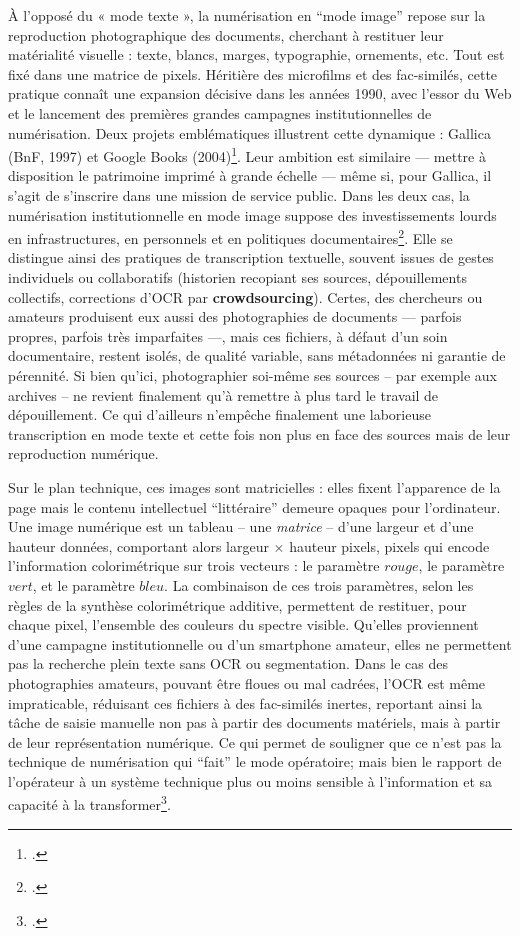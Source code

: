 À l’opposé du « mode texte », la numérisation en \enquote{mode image} repose sur la reproduction photographique des documents, cherchant à restituer leur matérialité visuelle : texte, blancs, marges, typographie, ornements, etc. Tout est fixé dans une matrice de pixels. Héritière des microfilms et des fac-similés, cette pratique connaît une expansion décisive dans les années 1990, avec l’essor du Web et le lancement des premières grandes campagnes institutionnelles de numérisation. Deux projets emblématiques illustrent cette dynamique : Gallica (BnF, 1997) et Google Books (2004)\footcite[][]{bermesbook}. Leur ambition est similaire — mettre à disposition le patrimoine imprimé à grande échelle — même si, pour Gallica, il s'agit de s’inscrire dans une mission de service public. Dans les deux cas, la numérisation institutionnelle en mode image suppose des investissements lourds en infrastructures, en personnels et en politiques documentaires\footcite[][p. 66-88]{claerr}. Elle se distingue ainsi des pratiques de transcription textuelle, souvent issues de gestes individuels ou collaboratifs (historien recopiant ses sources, dépouillements collectifs, corrections d’OCR par \textbf{crowdsourcing}). Certes, des chercheurs ou amateurs produisent eux aussi des photographies de documents — parfois propres, parfois très imparfaites —, mais ces fichiers, à défaut d'un soin documentaire, restent isolés, de qualité variable, sans métadonnées ni garantie de pérennité. Si bien qu'ici, photographier soi-même ses sources -- par exemple aux archives -- ne revient finalement qu'à remettre à plus tard le travail de dépouillement. Ce qui d'ailleurs n'empêche finalement une laborieuse transcription en mode texte et cette fois non plus en face des sources mais de leur reproduction numérique. 

Sur le plan technique, ces images sont matricielles : elles fixent l’apparence de la page mais le contenu intellectuel \enquote{littéraire} demeure opaques pour l’ordinateur. Une image numérique est un tableau -- une \emph{matrice} -- d'une largeur et d'une hauteur données, comportant alors largeur $\times$ hauteur pixels, pixels qui encode l'information colorimétrique sur trois vecteurs : le paramètre $rouge$, le paramètre $vert$, et le paramètre $bleu$. La combinaison de ces trois paramètres, selon les règles de la synthèse colorimétrique additive, permettent de restituer, pour chaque pixel, l'ensemble des couleurs du spectre visible. Qu’elles proviennent d’une campagne institutionnelle ou d’un smartphone amateur, elles ne permettent pas la recherche plein texte sans OCR ou segmentation. Dans le cas des photographies amateurs, pouvant être floues ou mal cadrées, l’OCR est même impraticable, réduisant ces fichiers à des fac-similés inertes, reportant ainsi la tâche de saisie manuelle non pas à partir des documents matériels, mais à partir de leur représentation numérique. Ce qui permet de souligner que ce n'est pas la technique de numérisation qui \enquote{fait} le mode opératoire; mais bien le rapport de l'opérateur à un système technique plus ou moins sensible à l'information et sa capacité à la transformer\footcite[][]{meot}.

